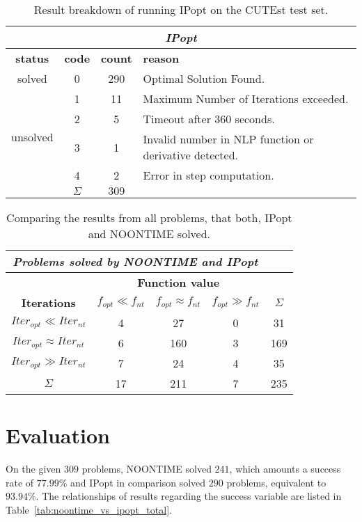 \begin{table}[H]
\begin{tabular}{cccl}
	\multicolumn{4}{c}{\textit{IPopt}} \\
	\toprule
	\toprule
	\textbf{status} & \textbf{code} & \textbf{count} & \textbf{reason} \\
	\midrule
	solved & 0 & 290 & Optimal Solution Found. \\
	\midrule
	\multirow{4}{*}{unsolved}
	& 1 & 11 & Maximum Number of Iterations exceeded. \\
	& 2 & 5 & Timeout after 360 seconds. \\
	& 3 & 1 & Invalid number in NLP function or derivative detected. \\
	& 4 & 2 & Error in step computation. \\
	\bottomrule
	& $\Sigma$  &  $309$ & \\
	\bottomrule
\end{tabular}
\caption{Result breakdown of running IPopt on the CUTEst test set.}
\label{tab:stat:ipopt}
\end{table}

\begin{table}[H]
	\begin{tabular}{ccccc}
		\multicolumn{4}{c}{\textit{Problems solved by NOONTIME and IPopt}} \\
		\toprule
		\toprule
		& \multicolumn{3}{c}{\textbf{Function value}} \\
		\cmidrule{2-4}
		\textbf{Iterations} & $f_{opt} \ll f_{nt}$ & $f_{opt} \approx f_{nt}$  &  $f_{opt} \gg f_{nt}$ & $\Sigma$\\
		\midrule
		$Iter_{opt} \ll Iter_{nt}$  & 4 & 27 & 0 & 31 \\
		$Iter_{opt} \approx Iter_{nt}$ & 6 & 160 & 3 & 169 \\
		$Iter_{opt} \gg Iter_{nt}$ & 7 & 24 & 4 & 35 \\
		\midrule
		$\Sigma$ & 17 & 211 & 7 & 235  \\
		\bottomrule
	\end{tabular}
	\caption{Comparing the results from all problems, that both, IPopt and NOONTIME solved.} 
	\label{tab:ipopt_vs_noontime_solved}
\end{table}


\section{Evaluation}
On the given $309$ problems, NOONTIME solved $241$, which amounts a success rate of $77.99 \%$ and IPopt in comparison solved $290$ problems, equivalent to $93.94 \%$. The relationships of results regarding the success variable are listed in Table~\ref{tab:noontime_vs_ipopt_total}.

